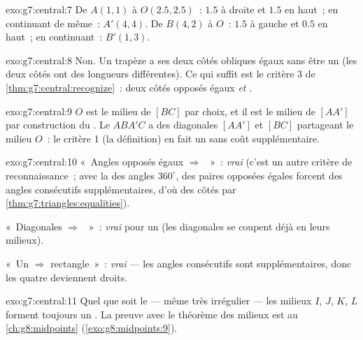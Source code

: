 \begin{solution}{exo:g7:central:7}
De $A(1,1)$ à $O(2.5, 2.5)$~: $1.5$ à droite et $1.5$ en haut~; en
continuant de même~: $A'(4, 4)$. De $B(4,2)$ à $O$~: $1.5$ à gauche
et $0.5$ en haut~; en continuant~: $B'(1, 3)$.
\end{solution}

\begin{solution}{exo:g7:central:8}
Non. Un trapèze  a ses deux côtés obliques égaux sans être un
 (les deux côtés  ont des longueurs
différentes). Ce qui suffit est le critère 3 de
\cref{thm:g7:central:recognize}~: deux côtés opposés égaux
\emph{et }.
\end{solution}

\begin{solution}{exo:g7:central:9}
$O$ est le milieu de $[BC]$ par choix, et il est le milieu de
$[AA']$ par construction du . Le  $ABA'C$ a
des diagonales $[AA']$ et $[BC]$ partageant le milieu $O$~: le
critère 1 (la définition) en fait un  sans coût
supplémentaire.
\end{solution}

\begin{solution}{exo:g7:central:10}
«~Angles opposés égaux $\Rightarrow$ ~»~: \emph{vrai}
(c'est un autre critère de reconnaissance~; avec la  des angles
$360^\circ$, des paires opposées égales forcent des angles
consécutifs supplémentaires, d'où des côtés  par
\cref{thm:g7:triangles:equalities}).

«~Diagonales  $\Rightarrow$ ~»~: \emph{vrai}
pour un  (les diagonales se coupent déjà en leurs
milieux).

«~Un  $\Rightarrow$ rectangle~»~: \emph{vrai} --- les
angles consécutifs sont supplémentaires, donc les quatre deviennent
droits.
\end{solution}

\begin{solution}{exo:g7:central:11}
Quel que soit le  --- même très irrégulier --- les
milieux $I$, $J$, $K$, $L$ forment toujours un
\emph{}. La preuve avec le théorème des milieux est au
\cref{ch:g8:midpoints} (\cref{exo:g8:midpoints:9}).
\end{solution}

